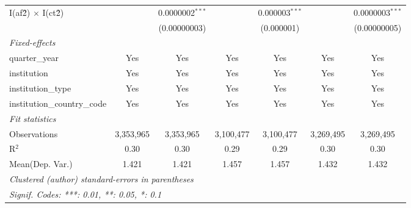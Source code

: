 \begin{tabular}{lcccccc}
   I(af\^2) $\times$ I(ct\^2)         &               & 0.0000002$^{***}$ &               & 0.000003$^{***}$ &               & 0.0000003$^{***}$\\   
                                      &               & (0.00000003)      &               & (0.000001)       &               & (0.00000005)\\   
   \midrule
   \emph{Fixed-effects}\\
   quarter\_year                      & Yes           & Yes               & Yes           & Yes              & Yes           & Yes\\  
   institution                        & Yes           & Yes               & Yes           & Yes              & Yes           & Yes\\  
   institution\_type                  & Yes           & Yes               & Yes           & Yes              & Yes           & Yes\\  
   institution\_country\_code         & Yes           & Yes               & Yes           & Yes              & Yes           & Yes\\  
   \midrule
   \emph{Fit statistics}\\
   Observations                       & 3,353,965     & 3,353,965         & 3,100,477     & 3,100,477        & 3,269,495     & 3,269,495\\  
   R$^2$                              & 0.30          & 0.30              & 0.29          & 0.29             & 0.30          & 0.30\\  
Mean(Dep. Var.) & 1.421 & 1.421 & 1.457 & 1.457 & 1.432 & 1.432 \\
   \midrule \midrule
   \multicolumn{7}{l}{\emph{Clustered (author) standard-errors in parentheses}}\\
   \multicolumn{7}{l}{\emph{Signif. Codes: ***: 0.01, **: 0.05, *: 0.1}}\\
\end{tabular}
\par\endgroup
